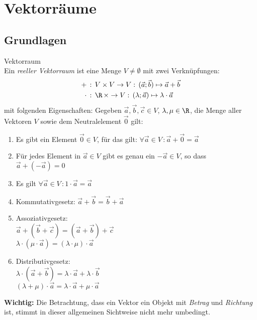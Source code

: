 \graphicspath{{images/}}

\section{Vektorräume}

\subsection{Grundlagen}
    \begin{definition}{Vektorraum}\\
        Ein \textit{reeller Vektorraum} ist eine Menge $V\neq\emptyset$ mit zwei Verknüpfungen:
        \begin{align*}
            +\,&:\,V\times V\rightarrow V:\,(\vec{a};\vec{b})\mapsto\vec{a}+\vec{b}\\
            \cdot\,&:\,\R\,\times\rightarrow V:\,(\lambda;\vec{a})\mapsto\lambda\cdot\vec{a}
        \end{align*}
        mit folgenden Eigenschaften:
        Gegeben $\vec{a},\vec{b},\vec{c}\in V$, $\lambda,\mu\in \R$, die Menge aller Vektoren $V$ 
        sowie dem Neutralelement $\vec{0}$ gilt:
        \begin{enumerate}
            \item Es gibt ein Element $\vec{0}\in V$, für das gilt: $\forall \vec{a}\in V\,:\vec{a}+\vec{0}=\vec{a}$
            \item Für jedes Element in $\vec{a}\in V$ gibt es genau ein $-\vec{a}\in V$, so dass $\vec{a}+(-\vec{a})=0$
            \item Es gilt $\forall \vec{a}\in V\,:1\cdot\vec{a}=\vec{a}$
            \item Kommutativgesetz: $\vec{a}+\vec{b}=\vec{b}+\vec{a}$
            \item Assoziativgesetz: \\
                $\vec{a}+(\vec{b}+\vec{c})=(\vec{a}+\vec{b})+\vec{c}$\\
                $\lambda\cdot(\mu\cdot\vec{a})=(\lambda\cdot\mu)\cdot\vec{a}$
            \item Distributivgesetz: \\
                $\lambda\cdot(\vec{a}+\vec{b})=\lambda\cdot\vec{a}+\lambda\cdot\vec{b}$\\
                $(\lambda+\mu)\cdot\vec{a}=\lambda\cdot\vec{a}+\mu\cdot\vec{a}$
        \end{enumerate}
        \textbf{Wichtig:} Die Betrachtung, dass ein Vektor ein Objekt mit \textit{Betrag} und \textit{Richtung} ist,
        stimmt in dieser allgemeinen Sichtweise nicht mehr umbedingt.
    \end{definition}

